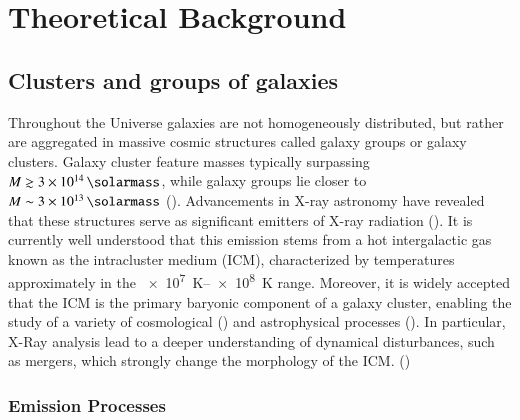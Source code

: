 
\chapter{Theoretical Background}
\label{sec:theoretical_background}

\section{Clusters and groups of galaxies}
Throughout the Universe galaxies are not homogeneously distributed, but rather are aggregated in massive cosmic structures called galaxy groups or galaxy clusters. Galaxy cluster feature masses typically surpassing \(M \gtrsim  \SI{3e14}{\solarmass}\), while galaxy groups lie closer to \(M \sim \SI{3e13}{\solarmass}\) (\cite{Schneider_2006}). Advancements in X-ray astronomy have revealed that these structures serve as significant emitters of X-ray radiation (\cite{Cavaliere_1971}). It is currently well understood that this emission stems from a hot intergalactic gas known as the intracluster medium (ICM), characterized by temperatures approximately in the \SIrange{e7}{e8}{\kelvin} range. Moreover, it is widely accepted that the ICM is the primary baryonic component of a galaxy cluster, enabling the study of a variety of cosmological (\cite{Kaiser_1986}) and astrophysical processes (\cite{Lovisari&Reiprich_2018}). In particular, X-Ray analysis lead to a deeper understanding of dynamical disturbances, such as mergers, which strongly change the morphology of the ICM. (\cite{Bykov_2015})
%
\subsection{Emission Processes}